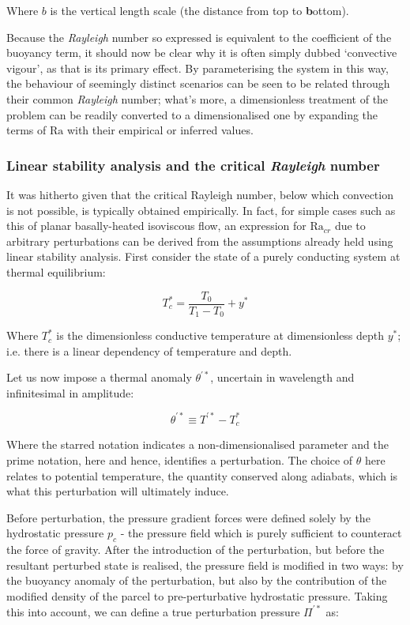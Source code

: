 \documentclass[a4paper,11pt,oneside]{book}
\begin{document}
Where $b$ is the vertical length scale (the distance from top to \textbf{b}ottom).

Because the \textit{Rayleigh} number so expressed is equivalent to the coefficient of the buoyancy term, it should now be clear why it is often simply dubbed `convective vigour', as that is its primary effect. By parameterising the system in this way, the behaviour of seemingly distinct scenarios can be seen to be related through their common \textit{Rayleigh} number; what's more, a dimensionless treatment of the problem can be readily converted to a dimensionalised one by expanding the terms of $\mathrm{Ra}$ with their empirical or inferred values.

\subsubsection{Linear stability analysis and the critical \textit{Rayleigh} number}

It was hitherto given that the critical Rayleigh number, below which convection is not possible, is typically obtained empirically. In fact, for simple cases such as this of planar basally-heated isoviscous flow, an expression for $\mathrm{Ra}_{cr}$ due to arbitrary perturbations can be derived from the assumptions already held using linear stability analysis. First consider the state of a purely conducting system at thermal equilibrium:

\begin{equation}
T_c^* = \frac{T_0}{T_1 - T_0} + y^*
\end{equation}

Where $T_c^*$ is the dimensionless conductive temperature at dimensionless depth $y^*$; i.e. there is a linear dependency of temperature and depth.

Let us now impose a thermal anomaly $\theta^{'*}$, uncertain in wavelength and infinitesimal in amplitude:

\begin{equation}
\theta^{'*} \equiv T^{'*} - T_c^*
\end{equation}

Where the starred notation indicates a non-dimensionalised parameter and the prime notation, here and hence, identifies a perturbation. The choice of $\theta$ here relates to potential temperature, the quantity conserved along adiabats, which is what this perturbation will ultimately induce.

Before perturbation, the pressure gradient forces were defined solely by the hydrostatic pressure $p_c$ - the pressure field which is purely sufficient to counteract the force of gravity. After the introduction of the perturbation, but before the resultant perturbed state is realised, the pressure field is modified in two ways: by the buoyancy anomaly of the perturbation, but also by the contribution of the modified density of the parcel to pre-perturbative hydrostatic pressure. Taking this into account, we can define a true perturbation pressure $\Pi^{'*}$ as:
\end{document}
